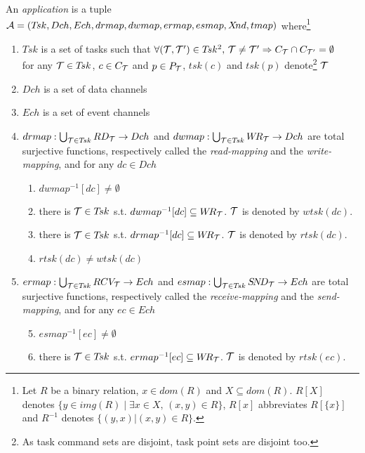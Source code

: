 \documentclass{article}
\begin{document}
\begin{definition}\label{def-mapp}$~$\\
 An {\em application} is a tuple ${\cal A}=(T\!sk,Dch,Ech,drmap,dwmap,ermap,esmap,X\!nd,tmap)$ where\footnote{Let $R$ be a binary relation, $x\in dom(R)$ and $X\subseteq dom(R)$. $R[X]$ denotes $\{y\in img(R)\mid\exists x\in X,\,(x,y)\in R\}$, $R[x]$ abbreviates $R[\{x\}]$ and $R^{-1}$ denotes $\{(y,x)|(x,y)\in R\}$.}
\begin{enumerate}
\item $T\!sk$ is a set of tasks such that $\forall ({\cal T, T'})\in T\!sk^2,\, {\cal T\neq T'}\Rightarrow C_{\cal T}\cap C_{\cal T'}=\emptyset$\\
for any ${\cal T}\in T\!sk$, $c\in C_{\cal T}$ and $p\in P_{\cal T}$, $tsk(c)$ and $tsk(p)$ denote\footnote{As task command sets are disjoint, task point sets are disjoint too.} ${\cal T}$
\item $Dch$ is a set of data channels
\item $Ech$ is a set of event channels
\item $drmap: \bigcup_{{\cal T}\in T\!sk}RD_{\cal T}\rightarrow Dch$ and
      $dwmap: \bigcup_{{\cal T}\in T\!sk}W\!R_{\cal T}\rightarrow Dch$ are total surjective functions, respectively called the {\em read-mapping} and the {\em write-mapping}, and for any $dc\in Dch$
			\begin{enumerate}
			\item $dwmap^{-1}[dc]\neq\emptyset$
			\item there is ${\cal T}\in T\!sk$ s.t. $dwmap^{-1}[dc]\subseteq W\!R_{\cal T}$. ${\cal T}$ is denoted by $wtsk(dc)$.
			\item there is ${\cal T}\in T\!sk$ s.t. $drmap^{-1}[dc]\subseteq W\!R_{\cal T}$. ${\cal T}$ is denoted by $rtsk(dc)$.
			\item $rtsk(dc)\neq wtsk(dc)$
			\end{enumerate}
\item $ermap: \bigcup_{{\cal T}\in T\!sk}RCV_{\cal T}\rightarrow Ech$ and
      $esmap: \bigcup_{{\cal T}\in T\!sk}S\!N\!D_{\cal T}\rightarrow Ech$ are total surjective functions, respectively called the {\em receive-mapping} and the {\em send-mapping}, and for any $ec\in Ech$
			\begin{enumerate}\setcounter{enumii}{4}
			\item $esmap^{-1}[ec]\neq\emptyset$
			\item there is ${\cal T}\in T\!sk$ s.t. $ermap^{-1}[ec]\subseteq W\!R_{\cal T}$. ${\cal T}$ is denoted by $rtsk(ec)$.

\end{enumerate}
\end{enumerate}
\end{definition}
\end{document}
